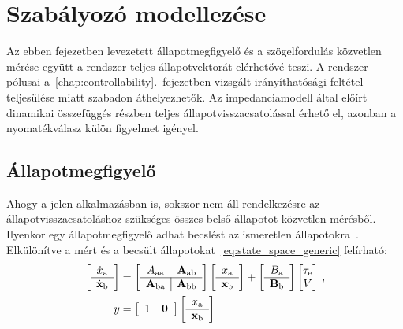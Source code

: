 \chapter{Szabályozó modellezése}\label{chap:controller}

Az ebben fejezetben levezetett állapotmegfigyelő és a szögelfordulás közvetlen mérése
együtt a rendszer teljes állapotvektorát elérhetővé teszi. A rendszer pólusai a~\ref{chap:controllability}.\ fejezetben
vizsgált irányíthatósági feltétel teljesülése miatt szabadon áthelyezhetők. 
Az impedanciamodell által előírt dinamikai összefüggés részben teljes állapotvisszacsatolással érhető el, 
azonban a nyomatékválasz külön figyelmet igényel.  

\section{Állapotmegfigyelő}\label{chap:observer}
Ahogy a jelen alkalmazásban is, sokszor nem áll rendelkezésre az állapotvisszacsatoláshoz szükséges 
összes belső állapotot közvetlen mérésből. Ilyenkor egy állapotmegfigyelő adhat becslést az ismeretlen 
állapotokra~\citep{kalman1960new,OgataModernControl}. Elkülönítve a mért és a becsült állapotokat~\eqref{eq:state_space_generic} 
felírható:
\begin{equation}\label{eq:observer_state}
    \begin{split}
    \left[\begin{array}{c}
        \dot x_{\mathrm{a}} \\ \hline
        \dot{\mathbf{x}}_{\mathrm{b}}
    \end{array}\right]
    &=
    \left[\begin{array}{c|c}
        A_{\mathrm{aa}} & \mathbf{A}_{\mathrm{a b}} \\ \hline
        \mathbf{A}_{\mathrm{ba}} & \mathbf{A}_{\mathrm{bb}}
    \end{array}\right]
    \left[\begin{array}{c}
        x_{\mathrm{a}} \\ \hline
        \mathbf{x}_{\mathrm{b}}
    \end{array}\right]
    +
    \left[\begin{array}{c}
        B_{\mathrm{a}} \\ \hline
        \mathbf{B}_{\mathrm{b}}
    \end{array}\right]
    \begin{bmatrix}
        \tau_{\mathrm{e}} \\
        V \\
    \end{bmatrix}\,,\\
    y &= 
    \left[\begin{array}{c|c}
        1 & \mathbf{0}
    \end{array}\right]
    \left[\begin{array}{c}
        x_{\mathrm{a}} \\ \hline
        \mathbf{x}_{\mathrm{b}}
    \end{array}\right]
    \end{split}
\end{equation}
